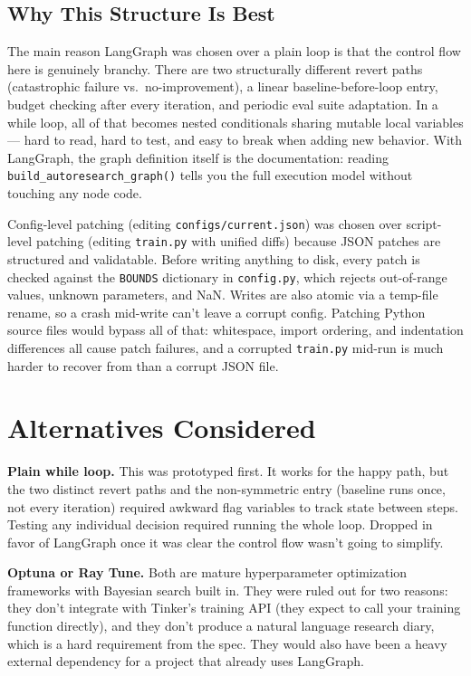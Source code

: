 \documentclass[11pt,letterpaper]{article}
\begin{document}
\subsection{Why This Structure Is Best}

The main reason LangGraph was chosen over a plain loop is that the control flow here is genuinely branchy. There are two structurally different revert paths (catastrophic failure vs.\ no-improvement), a linear baseline-before-loop entry, budget checking after every iteration, and periodic eval suite adaptation. In a while loop, all of that becomes nested conditionals sharing mutable local variables --- hard to read, hard to test, and easy to break when adding new behavior. With LangGraph, the graph definition itself is the documentation: reading \texttt{build\_autoresearch\_graph()} tells you the full execution model without touching any node code.

Config-level patching (editing \texttt{configs/current.json}) was chosen over script-level patching (editing \texttt{train.py} with unified diffs) because JSON patches are structured and validatable. Before writing anything to disk, every patch is checked against the \texttt{BOUNDS} dictionary in \texttt{config.py}, which rejects out-of-range values, unknown parameters, and NaN. Writes are also atomic via a temp-file rename, so a crash mid-write can't leave a corrupt config. Patching Python source files would bypass all of that: whitespace, import ordering, and indentation differences all cause patch failures, and a corrupted \texttt{train.py} mid-run is much harder to recover from than a corrupt JSON file.

\section{Alternatives Considered}

\textbf{Plain while loop.} This was prototyped first. It works for the happy path, but the two distinct revert paths and the non-symmetric entry (baseline runs once, not every iteration) required awkward flag variables to track state between steps. Testing any individual decision required running the whole loop. Dropped in favor of LangGraph once it was clear the control flow wasn't going to simplify.

\textbf{Optuna or Ray Tune.} Both are mature hyperparameter optimization frameworks with Bayesian search built in. They were ruled out for two reasons: they don't integrate with Tinker's training API (they expect to call your training function directly), and they don't produce a natural language research diary, which is a hard requirement from the spec. They would also have been a heavy external dependency for a project that already uses LangGraph.
\end{document}
